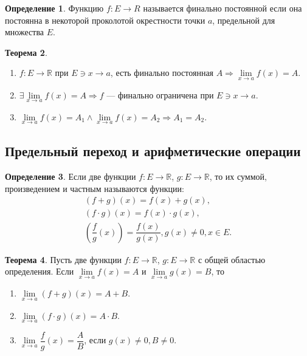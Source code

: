 \documentclass[12pt]{report}
\theoremstyle{definition}
\newtheorem{theorem}{Теорема}[chapter]
\newtheorem{definition}[theorem]{Определение}
\newcommand{\R}{\mathbb R}
\begin{document}
\begin{definition}
  Функцию $f: E \rightarrow R$ называется финально постоянной если она постоянна в некоторой
  проколотой окрестности точки $a$, предельной для множества $E$.
\end{definition}

\begin{theorem}
  \begin{enumerate}
    \item $f: E \rightarrow \R$ при $E \ni x \rightarrow a$, есть финально постоянная
      $A \Rightarrow \lim\limits_{x\rightarrow a} f(x) = A$.
    \item $\exists \lim\limits_{x\rightarrow a} f(x) = A \Rightarrow f$ --- финально ограничена при $E \ni x \rightarrow a$.
    \item $\lim\limits_{x\rightarrow a} f(x) = A_1 \land \lim\limits_{x\rightarrow a} f(x) = A_2 \Rightarrow A_1 = A_2$.
  \end{enumerate}
\end{theorem}

\subsection{Предельный переход и арифметические операции}
\begin{definition}
  Если две функции $f: E \rightarrow \R$, $g: E \rightarrow \R$, то их суммой, произведением и частным
  называются функции:
  \begin{gather*}
    (f + g)(x) = f(x) + g(x), \\
    (f \cdot g)(x) = f(x) \cdot g(x), \\
    \left(\dfrac{f}{g}(x)\right) = \dfrac{f(x)}{g(x)}, g(x) \ne 0, x \in E.
  \end{gather*}
\end{definition}

\begin{theorem}
  Пусть две функции $f: E \rightarrow \R$, $g: E \rightarrow \R$ с общей областью определения.
  Если $\lim\limits_{x\rightarrow a} f(x) = A$ и $\lim\limits_{x\rightarrow a} g(x) = B$, то
  \begin{enumerate}
    \item $\lim\limits_{x\rightarrow a} (f + g)(x) = A + B$.
    \item $\lim\limits_{x\rightarrow a} (f \cdot g)(x) = A \cdot B$.
    \item $\lim\limits_{x\rightarrow a} \dfrac{f}{g}(x) = \dfrac{A}{B}$, если $g(x) \ne 0, B \ne 0$.
  \end{enumerate}
\end{theorem}
\end{document}
